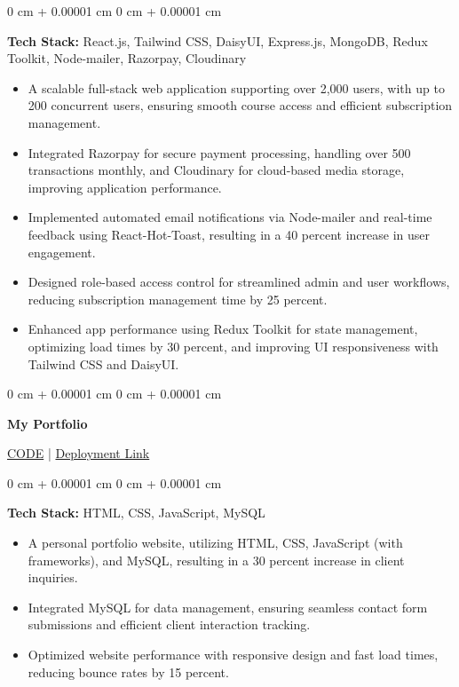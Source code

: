 \documentclass[10pt, letterpaper]{article}
\newenvironment{highlights}{
    \begin{itemize}[
        topsep=0.10 cm,
        parsep=0.10 cm,
        partopsep=0pt,
        itemsep=0pt,
        leftmargin=0 cm + 10pt
    ]
}{
    \end{itemize}
} %
\newenvironment{onecolentry}{
    \begin{adjustwidth}{
        0 cm + 0.00001 cm
    }{
        0 cm + 0.00001 cm
    }
}{
    \end{adjustwidth}
} %
\newenvironment{twocolentry}[2][]{
    \onecolentry
    \def\secondColumn{#2}
    \setcolumnwidth{\fill, 4.5 cm}
    \begin{paracol}{2}
}{
    \switchcolumn \raggedleft \secondColumn
    \end{paracol}
    \endonecolentry
} %
\begin{document}
\vspace{0.10 cm}

\begin{onecolentry}
    \textbf{Tech Stack:} React.js, Tailwind CSS, DaisyUI, Express.js, MongoDB, Redux Toolkit, Node-mailer, Razorpay, Cloudinary

    \begin{highlights}
        \item A scalable full-stack web application supporting over 2,000 users, with up to 200 concurrent users, ensuring smooth course access and efficient subscription management.
        \item Integrated Razorpay for secure payment processing, handling over 500 transactions monthly, and Cloudinary for cloud-based media storage, improving application performance.
        \item Implemented automated email notifications via Node-mailer and real-time feedback using React-Hot-Toast, resulting in a 40 percent increase in user engagement.
        \item Designed role-based access control for streamlined admin and user workflows, reducing subscription management time by 25 percent.
        \item Enhanced app performance using Redux Toolkit for state management, optimizing load times by 30 percent, and improving UI responsiveness with Tailwind CSS and DaisyUI.
    \end{highlights}
\end{onecolentry}
        
     \begin{twocolentry}{
    \href{https://github.com/rahemur0910/Protfolio-Beta}{CODE} |
    \href{https://master--rahemurprotfolio.netlify.app/}{Deployment Link}
}
    \textbf{My Portfolio}
\end{twocolentry}

\vspace{0.10 cm}
\begin{onecolentry}
    \textbf{Tech Stack:} HTML, CSS, JavaScript, MySQL

    \begin{highlights}
        \item A personal portfolio website, utilizing HTML, CSS, JavaScript (with frameworks), and MySQL, resulting in a 30 percent increase in client inquiries.
        \item Integrated MySQL for data management, ensuring seamless contact form submissions and efficient client interaction tracking.
        \item Optimized website performance with responsive design and fast load times, reducing bounce rates by 15 percent.
    \end{highlights}
\end{onecolentry}
\end{document}
